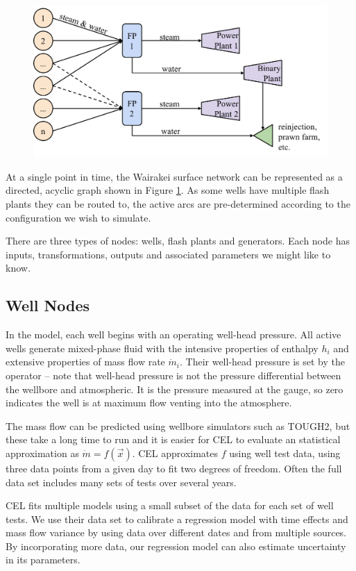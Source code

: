 \documentclass[a4paper, 12pt]{article}
\begin{document}
\begin{figure}
  \centering
  \includegraphics[width=0.5\linewidth]{media/network_diagram}
  \label{fig:network_diagram}
\end{figure}

At a single point in time, the Wairakei surface network can be represented as a directed, acyclic graph shown in Figure \ref{fig:network_diagram}. As some wells have multiple flash plants they can be routed to, the active arcs are pre-determined according to the configuration we wish to simulate.

There are three types of nodes: wells, flash plants and generators. Each node has inputs, transformations,  outputs and associated parameters we might like to know.

\subsection{Well Nodes}
In the model, each well begins with an operating well-head pressure. All active wells generate mixed-phase fluid with the intensive properties of enthalpy $h_i$ and extensive properties of mass flow rate $\dot{m}_i$. Their well-head pressure is set by the operator -- note that well-head pressure is not the pressure differential between the wellbore and atmospheric. It is the pressure measured at the gauge, so zero indicates the well is at maximum flow venting into the atmosphere.

The mass flow can be predicted using wellbore simulators such as TOUGH2, but these take a long time to run and it is easier for CEL to evaluate an statistical approximation as $\dot{m} = f(\vec{x})$. CEL approximates $f$ using well test data, using three data points from a given day to fit two degrees of freedom. Often the full data set includes many sets of tests over several years.

CEL fits multiple models using a small subset of the data for each set of well tests. We use their data set to calibrate a regression model with time effects and mass flow variance by using data over different dates and from multiple sources. By incorporating more data, our regression model can also estimate uncertainty in its parameters.
\end{document}

